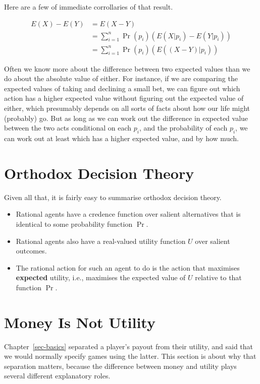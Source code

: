 \documentclass[
  11pt,
  letterpaper,
]{scrbook}
\providecommand{\tightlist}{%
  \setlength{\itemsep}{0pt}\setlength{\parskip}{0pt}}
\begin{document}
Here are a few of immediate corrollaries of that result.

\begin{align*}
E(X) -E(Y) &= E(X - Y) \\
&= \sum_{i=1}^n \Pr(p_i) (E(X | p_i) - E(Y | p_i)) \\
&= \sum_{i=1}^n \Pr(p_i) (E((X - Y) | p_i))
\end{align*}

Often we know more about the difference between two expected values than
we do about the absolute value of either. For instance, if we are
comparing the expected values of taking and declining a small bet, we
can figure out which action has a higher expected value without figuring
out the expected value of either, which presumably depends on all sorts
of facts about how our life might (probably) go. But as long as we can
work out the difference in expected value between the two acts
conditional on each \(p_i\), and the probability of each \(p_i\), we can
work out at least which has a higher expected value, and by how much.

\section{Orthodox Decision Theory}\label{sec-orthodox-decision-theory}

Given all that, it is fairly easy to summarise orthodox decision theory.

\begin{itemize}
\tightlist
\item
  Rational agents have a credence function over salient alternatives
  that is identical to some probability function \(\Pr\).
\item
  Rational agents also have a real-valued utility function \(U\) over
  salient outcomes.
\item
  The rational action for such an agent to do is the action that
  maximises \textbf{expected} utility, i.e., maximises the expected
  value of \(U\) relative to that function \(\Pr\).
\end{itemize}

\section{Money Is Not Utility}\label{sec-money-not-utility}

Chapter~\ref{sec-basics} separated a player's payout from their utility,
and said that we would normally specify games using the latter. This
section is about why that separation matters, because the difference
between money and utility plays several different explanatory roles.
\end{document}
